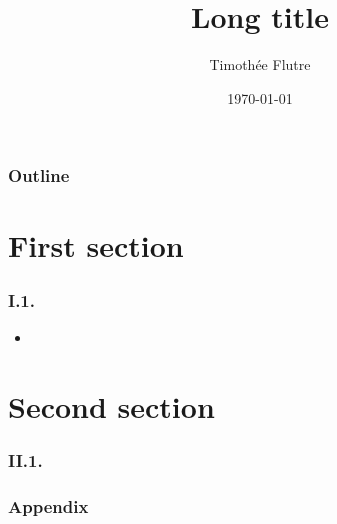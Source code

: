 \documentclass[c]{beamer} %
\title[Short title]{Long title}
\author[T. Flutre]{Timoth\'{e}e Flutre}
\institute[Short affiliation]{Long affiliation}
\date{\today}
\begin{document}
\begin{frame}
  \titlepage
\end{frame}                                                                                                                       

\begin{frame}
  \frametitle{Outline}
  \tableofcontents
\end{frame}

\section{First section}
\begin{frame}
  \frametitle{I.1.}
  \begin{itemize}
  \item 
  \end{itemize}
\end{frame}

\section{Second section}

\begin{frame}
  \frametitle{II.1.}
  \begin{center}
  \end{center}
\end{frame}

\appendix
{}
\setcounter{finalframe}{\value{framenumber}}

\begin{frame}
  \frametitle{Appendix}
\end{frame}

\setcounter{framenumber}{\value{finalframe}}
\end{document}
